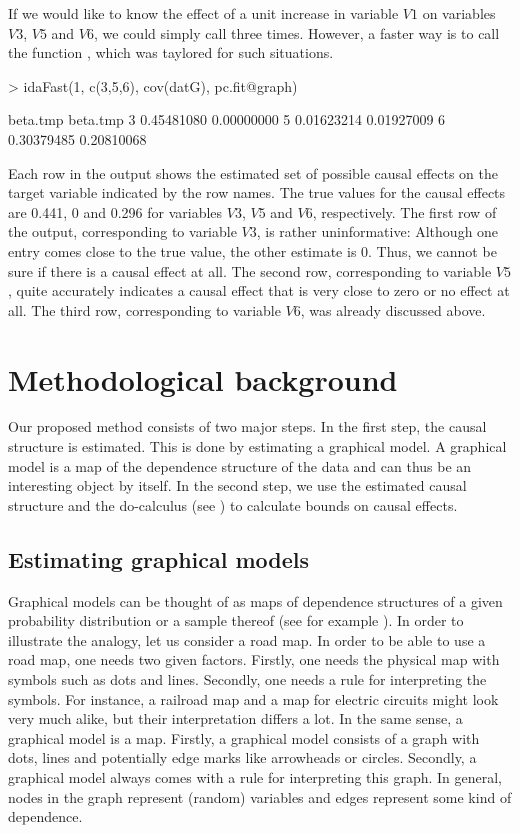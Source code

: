 \documentclass[article]{jss}
\begin{document}
If we would like to know the effect of a unit increase in variable $V1$ on
variables $V3$, $V5$ and $V6$, we could simply call  three
times. However, a faster way is to call the function , which
was taylored for such situations. 

\begin{Schunk}
\begin{Sinput}
> idaFast(1, c(3,5,6), cov(datG), pc.fit@graph)
\end{Sinput}
\begin{Soutput}
    beta.tmp   beta.tmp
3 0.45481080 0.00000000
5 0.01623214 0.01927009
6 0.30379485 0.20810068
\end{Soutput}
\end{Schunk}

Each row in the output shows the estimated set of possible causal
effects on the target variable indicated by the row names.  The true
values for the causal effects are 0.441, 0 and 0.296 for variables $V3$,
$V5$ and $V6$, respectively. The first row of the output,
corresponding to variable $V3$, is rather uninformative: Although one entry
comes close to the true value, the other estimate is 0. Thus, we
cannot be sure if there is a causal effect at all. The second row,
corresponding to variable $V5$, quite accurately indicates a causal
effect that is very close to zero or no effect at all. The third row,
corresponding to variable $V6$, was already discussed above.

\section{Methodological background}
Our proposed method consists of two major steps. In the first step, the
causal structure is estimated. This is done by estimating a graphical
model. A graphical model is a map of the dependence structure of the data
and can thus be an interesting object by itself. In the second step, we use
the estimated causal structure and the do-calculus (see \cite{Pearl00}) to calculate
bounds on causal effects.

\subsection{Estimating graphical models} \label{sec:gm} 
Graphical models
can be thought of as maps of dependence structures of a given probability
distribution or a sample thereof (see for example \cite{lauritzen}). In
order to illustrate the analogy, let us consider a road map. In order to be
able to use a road map, one needs two given factors. Firstly, one needs the
physical map with symbols such as dots and lines. Secondly, one needs a
rule for interpreting the symbols. For instance, a railroad map and a map
for electric circuits might look very much alike, but their interpretation
differs a lot. In the same sense, a graphical model is a map. Firstly, a
graphical model consists of a graph with dots, lines and potentially edge
marks like arrowheads or circles. Secondly, a graphical model always comes
with a rule for interpreting this graph. In general, nodes in the graph
represent (random) variables and edges represent some kind of dependence.
\end{document}
